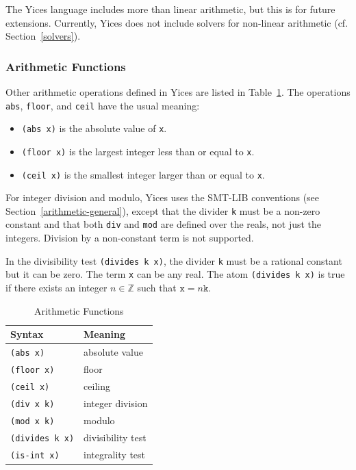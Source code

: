 \documentclass[11pt,twoside,fleqn,openright,titlepage]{cslreport}
\newcommand{\integers}{\ensuremath{\mathbb{Z}}}
\begin{document}
\medskip\noindent
The Yices language includes more than linear arithmetic, but this is
for future extensions. Currently, Yices does not include solvers for
non-linear arithmetic (cf. Section~\ref{solvers}).

\subsubsection*{Arithmetic Functions}

Other arithmetic operations defined in Yices are listed in Table~\ref{Arithmetic-Functions}.
The operations \texttt{abs}, \texttt{floor}, and \texttt{ceil} have the usual meaning:
\begin{itemize}
\item \texttt{(abs x)} is the absolute value of \texttt{x}.
\item \texttt{(floor x)} is the largest integer less than or equal to \texttt{x}.
\item \texttt{(ceil x)} is the smallest integer larger than or equal to \texttt{x}.
\end{itemize}
For integer division and modulo, Yices uses the SMT-LIB conventions (see
Section~\ref{arithmetic-general}), except that the divider \texttt{k}
must be a non-zero constant and that both \texttt{div} and
\texttt{mod} are defined over the reals, not just the integers.
Division by a non-constant term is not supported.

\medskip\noindent In the divisibility test \texttt{(divides k x)}, the
divider \texttt{k} must be a rational constant but it can be zero. The
term \texttt{x} can be any real. The atom \texttt{(divides k x)} is
true if there exists an integer $n\in\integers$ such that $\mathtt{x} = n
\mathtt{k}$.

\begin{table}[h]
\begin{small}
\begin{center}
\begin{tabular}{|p{3.4cm}|l|}
\hline Syntax & Meaning \\ 
\hline
\texttt{(abs x)} & absolute value \\ 
\texttt{(floor x)} & floor \\
\texttt{(ceil x)} & ceiling \\ 
\hline
\texttt{(div x k)} & integer division \\
\texttt{(mod x k)} & modulo \\ 
\texttt{(divides k x)} & divisibility test\\ 
\texttt{(is-int x)} & integrality test\\ 
\hline
\end{tabular}
\end{center}
\end{small}
\caption{Arithmetic Functions}
\label{Arithmetic-Functions}
\end{table}
\end{document}
